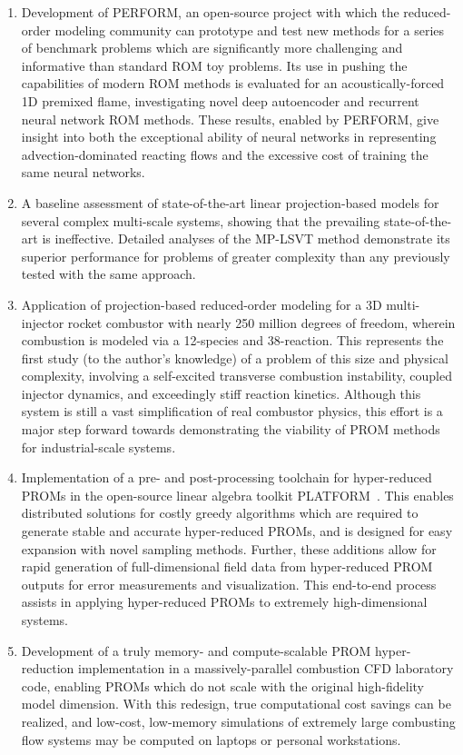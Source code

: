 \begin{enumerate}
    \item Development of PERFORM, an open-source project with which the reduced-order modeling community can prototype and test new methods for a series of benchmark problems which are significantly more challenging and informative than standard ROM toy problems. Its use in pushing the capabilities of modern ROM methods is evaluated for an acoustically-forced 1D premixed flame, investigating novel deep autoencoder and recurrent neural network ROM methods. These results, enabled by PERFORM, give insight into both the exceptional ability of neural networks in representing advection-dominated reacting flows and the excessive cost of training the same neural networks.
    \item A baseline assessment of state-of-the-art linear projection-based models for several complex multi-scale systems, showing that the prevailing state-of-the-art is ineffective. Detailed analyses of the MP-LSVT method demonstrate its superior performance for problems of greater complexity than any previously tested with the same approach.
    \item Application of projection-based reduced-order modeling for a 3D multi-injector rocket combustor with nearly 250 million degrees of freedom, wherein combustion is modeled via a 12-species and 38-reaction. This represents the first study (to the author's knowledge) of a problem of this size and physical complexity, involving a self-excited transverse combustion instability, coupled injector dynamics, and exceedingly stiff reaction kinetics. Although this system is still a vast simplification of real combustor physics, this effort is a major step forward towards demonstrating the viability of PROM methods for industrial-scale systems.
    \item Implementation of a pre- and post-processing toolchain for hyper-reduced PROMs in the open-source linear algebra toolkit PLATFORM~\cite{PLATFORM}. This enables distributed solutions for costly greedy algorithms which are required to generate stable and accurate hyper-reduced PROMs, and is designed for easy expansion with novel sampling methods. Further, these additions allow for rapid generation of full-dimensional field data from hyper-reduced PROM outputs for error measurements and visualization. This end-to-end process assists in applying hyper-reduced PROMs to extremely high-dimensional systems.
    \item Development of a truly memory- and compute-scalable PROM hyper-reduction implementation in a massively-parallel combustion CFD laboratory code, enabling PROMs which do not scale with the original high-fidelity model dimension. With this redesign, true computational cost savings can be realized, and low-cost, low-memory simulations of extremely large combusting flow systems may be computed on laptops or personal workstations.

\end{enumerate}
